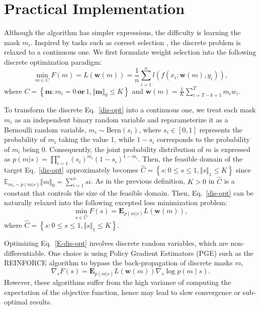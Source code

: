 \section{Practical \method{} Implementation}
Although the \method{} algorithm has simpler expressions, the difficulty is learning the mask $m_i$. Inspired by tasks such as coreset selection \cite{coreset}, the discrete problem is relaxed to a continuous one. We first formulate weight selection into the following discrete optimization paradigm:
\begin{equation}\label{dis-opt}
    \min_{m\in C}F(m)=L\left(\textbf{w}(m)\right)=\frac{1}{n}\sum_{i=1}^{n}l\left(f(x_i;\textbf{w}(m),y_i) \right),
\end{equation}
where $C=\left\{\textbf{m}: m_i = 0 \,\textbf{or}\, 1, \Vert \textbf{m}\Vert_0\leq K \right\}$ and $\textbf{w}(m)=\frac{1}{K} \sum_{i=T-k+1}^{T} m_{i}w_{i}$.

To transform the discrete Eq.~\eqref{dis-opt} into a continuous one, we treat each mask $m_i$ as an independent binary random variable and reparameterize it as a Bernoulli random variable, $m_i \sim \text{Bern}(s_i)$, where $s_i \in [0, 1]$ represents the probability of $m_i$ taking the value 1, while $1-s_i$ corresponds to the probability of $m_i$ being 0. Consequently, the joint probability distribution of $m$ is expressed as $p(m\vert s) = \prod _{i=1}^{n}(s_i)^{m_i}(1 - s_i)^{1 - m_i}$. Then, the feasible domain of the target Eq.~\eqref{dis-opt} approximately becomes $\hat{C}=\left\{s: 0\leq s\leq 1, \Vert s\Vert_1\leq K \right\}$ since $\mathbb{E}_{m_i \sim p(m\vert s)}\Vert m\Vert_0 = \sum_{i=1}^{n}si$. As in the previous definition, $K>0$ in $\hat{C}$ is a constant that controls the size of the feasible domain. Then, Eq.~\eqref{dis-opt} can be naturally relaxed into the following excepted loss minimization problem:
\begin{equation}\label{E-dis-opt}
    \min_{s\in \hat{C}}F(s)=\mathbf{E}_{p(m|s)}L\left(\textbf{w}(m)\right),
\end{equation}
where $\hat{C}=\left\{s: 0\leq s\leq 1, \Vert s\Vert_1\leq K \right\}$.

Optimizing Eq.~\eqref{E-dis-opt} involves discrete random variables, which are non-differentiable.
One choice is using Policy Gradient Estimators (PGE) such as 
the REINFORCE algorithm \citep{williams1992simple,sutton1999policy} to bypass the back-propagation of discrete masks $m$,
\begin{equation*}
    \nabla_s F(s)=\mathbf{E}_{p(m|s)} L\left(\textbf{w}(m)\right) \nabla_s \log p( m \mid s).
\end{equation*}
However, these algorithms suffer from the high variance of computing the expectation of the objective function, hence may lead to slow convergence or sub-optimal results.

